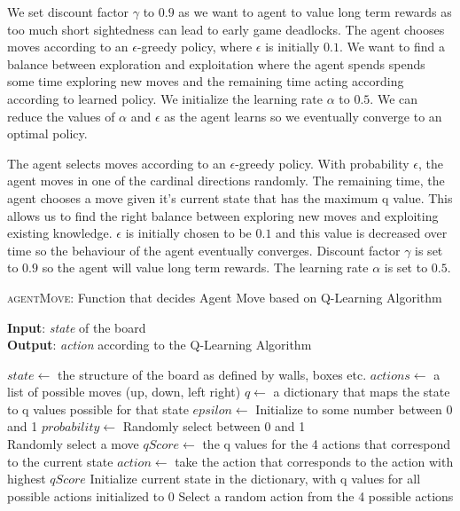 \documentclass{article}
\begin{document}
We set discount factor $\gamma$ to $0.9$ as we want to agent to value long term rewards as too much short sightedness can lead to early game deadlocks. The agent chooses moves according to an $\epsilon$-greedy policy, where $\epsilon$ is initially $0.1$. We want to find a balance between exploration and exploitation where the agent spends spends some time exploring new moves and the remaining time acting according according to learned policy. We initialize the learning rate $\alpha$ to $0.5$. We can reduce the values of $\alpha$ and $\epsilon$ as the agent learns so we eventually converge to an optimal policy. 

The agent selects moves according to an $\epsilon$-greedy policy. With probability $\epsilon$, the agent moves in one of the cardinal directions randomly. The remaining time, the agent chooses a move given it's current state that has the maximum q value. This allows us to find the right balance between exploring new moves and exploiting existing knowledge.  $\epsilon$ is initially chosen to be $0.1$ and this value is decreased over time so the behaviour of the agent eventually converges. Discount factor $\gamma$ is set to $0.9$ so the agent will value long term rewards. The learning rate $\alpha$ is set to $0.5$.

\begin{algorithm}
    \caption{\textsc{agentMove}: Function that decides Agent Move based on Q-Learning Algorithm}\label{euclid}
    \hspace*{\algorithmicindent} \textbf{Input}: \emph{state} of the board \\
    \hspace*{\algorithmicindent} \textbf{Output}: \emph{action} according to the Q-Learning  Algorithm \\
    \begin{algorithmic}
    \State $state \gets$ the structure of the board as defined by walls, boxes etc.
    \State $actions \gets$ a list of possible moves (up, down, left right)
    \State $q \gets$ a dictionary that maps the state to q values possible for that state
    \State $epsilon \gets$ Initialize to some number between 0 and 1
    \State $probability \gets$ Randomly select between 0 and 1 \\
        \State Randomly select a move
    \Else
            \State $qScore \gets$ the q values for the 4 actions that correspond to the current state
            \State $action \gets$ take the action that corresponds to the action with highest $qScore$
        \Else
            \State Initialize current state in the dictionary, with q values for all possible actions initialized to 0
            \State Select a random action from the 4 possible actions
        \EndIf
    \EndIf 
    \end{algorithmic}
\end{algorithm}
\end{document}
